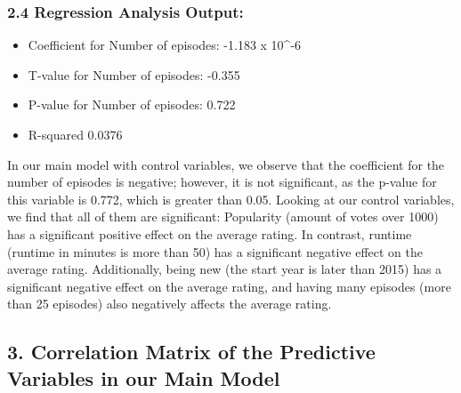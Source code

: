 \documentclass[
]{article}
\providecommand{\tightlist}{%
  \setlength{\itemsep}{0pt}\setlength{\parskip}{0pt}}
\begin{document}
\subsubsection{2.4 Regression Analysis
Output:}\label{regression-analysis-output-1}

\begin{itemize}
\tightlist
\item
  Coefficient for Number of episodes: -1.183 x 10\^{}-6
\item
  T-value for Number of episodes: -0.355
\item
  P-value for Number of episodes: 0.722
\item
  R-squared 0.0376
\end{itemize}

In our main model with control variables, we observe that the
coefficient for the number of episodes is negative; however, it is not
significant, as the p-value for this variable is 0.772, which is greater
than 0.05. Looking at our control variables, we find that all of them
are significant: Popularity (amount of votes over 1000) has a
significant positive effect on the average rating. In contrast, runtime
(runtime in minutes is more than 50) has a significant negative effect
on the average rating. Additionally, being new (the start year is later
than 2015) has a significant negative effect on the average rating, and
having many episodes (more than 25 episodes) also negatively affects the
average rating.

\subsection{3. Correlation Matrix of the Predictive Variables in our
Main
Model}\label{correlation-matrix-of-the-predictive-variables-in-our-main-model}
\end{document}
